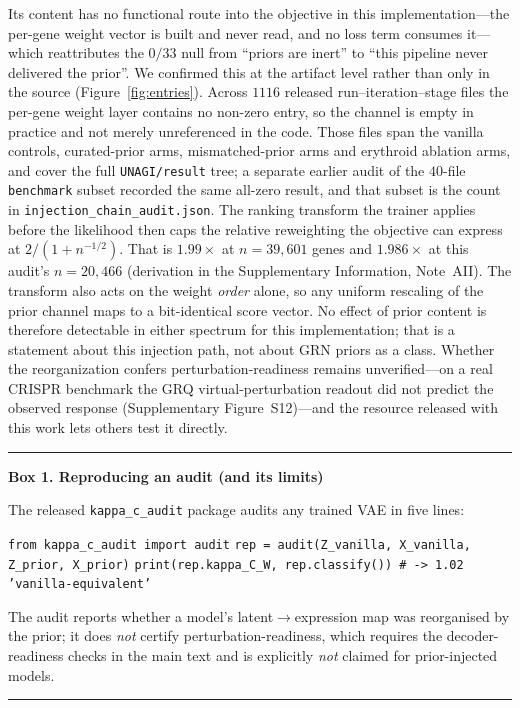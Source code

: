 \documentclass[11pt,a4paper]{article}
\newenvironment{boxednote}[1]{%
 \par\medskip\noindent\begin{minipage}{\linewidth}%
 \hrule\smallskip\textbf{#1}\par\smallskip\small}{%
 \smallskip\hrule\end{minipage}\par\medskip}
\begin{document}
 Its content has no functional route into the objective in this implementation---the per-gene weight vector is built and never read, and no loss term consumes it---which reattributes the $0/33$ null from ``priors are inert'' to ``this pipeline never delivered the prior''. We confirmed this at the artifact level rather than only in the source (Figure~\ref{fig:entries}). Across $1116$ released run--iteration--stage files the per-gene weight layer contains no non-zero entry, so the channel is empty in practice and not merely unreferenced in the code. Those files span the vanilla controls, curated-prior arms, mismatched-prior arms and erythroid ablation arms, and cover the full \texttt{UNAGI/result} tree; a separate earlier audit of the $40$-file \texttt{benchmark} subset recorded the same all-zero result, and that subset is the count in \texttt{injection\_chain\_audit.json}. The ranking transform the trainer applies before the likelihood then caps the relative reweighting the objective can express at $2/(1+n^{-1/2})$. That is $1.99\times$ at $n=39{,}601$ genes and $1.986\times$ at this audit's $n=20{,}466$ (derivation in the Supplementary Information, Note~AII). The transform also acts on the weight \emph{order} alone, so any uniform rescaling of the prior channel maps to a bit-identical score vector. No effect of prior content is therefore detectable in either spectrum for this implementation; that is a statement about this injection path, not about GRN priors as a class. Whether the reorganization confers perturbation-readiness remains unverified---on a real CRISPR benchmark the GRQ virtual-perturbation readout did not predict the observed response (Supplementary Figure~S12)---and the resource released with this work lets others test it directly.

\begin{boxednote}{Box 1. Reproducing an audit (and its limits)}
The released \texttt{kappa\_c\_audit} package audits any trained VAE in five lines:
\par\noindent\texttt{from kappa\_c\_audit import audit}
\texttt{rep = audit(Z\_vanilla, X\_vanilla, Z\_prior, X\_prior)}
\texttt{print(rep.kappa\_C\_W, rep.classify()) \# -> 1.02 'vanilla-equivalent'}
\par\smallskip\noindent The audit reports whether a model's latent$\to$expression map was reorganised by the prior; it does \emph{not} certify perturbation-readiness, which requires the decoder-readiness checks in the main text and is explicitly \emph{not} claimed for prior-injected models.
\end{boxednote}
\end{document}
